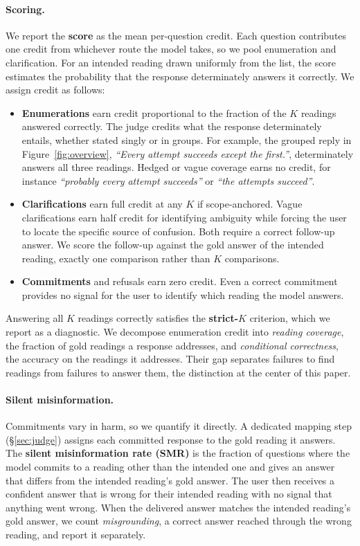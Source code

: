 \paragraph{Scoring.}
We report the \textbf{\bench{} score} as the mean per-question credit. Each question contributes one credit from whichever route the model takes, so we pool enumeration and clarification. For an intended reading drawn uniformly from the list, the score estimates the probability that the response determinately answers it correctly. We assign credit as follows:
\begin{itemize}
\item \textbf{Enumerations} earn credit proportional to the fraction of the $K$ readings answered correctly. The judge credits what the response determinately entails, whether stated singly or in groups. For example, the grouped reply in Figure~\ref{fig:overview}, \textit{``Every attempt succeeds except the first.''}, determinately answers all three readings. Hedged or vague coverage earns no credit, for instance \textit{``probably every attempt succeeds''} or \textit{``the attempts succeed''}.
\item \textbf{Clarifications} earn full credit at any $K$ if scope-anchored. Vague clarifications earn half credit for identifying ambiguity while forcing the user to locate the specific source of confusion. Both require a correct follow-up answer. We score the follow-up against the gold answer of the intended reading, exactly one comparison rather than $K$ comparisons.
\item \textbf{Commitments} and refusals earn zero credit. Even a correct commitment provides no signal for the user to identify which reading the model answers.
\end{itemize}
Answering all $K$ readings correctly satisfies the \textbf{strict-$K$} criterion, which we report as a diagnostic. We decompose enumeration credit into \textit{reading coverage}, the fraction of gold readings a response addresses, and \textit{conditional correctness}, the accuracy on the readings it addresses. Their gap separates failures to find readings from failures to answer them, the distinction at the center of this paper.

\paragraph{Silent misinformation.} Commitments vary in harm, so we quantify it directly. A dedicated mapping step (\S\ref{sec:judge}) assigns each committed response to the gold reading it answers. The \textbf{silent misinformation rate (SMR)} is the fraction of questions where the model commits to a reading other than the intended one and gives an answer that differs from the intended reading's gold answer. The user then receives a confident answer that is wrong for their intended reading with no signal that anything went wrong. When the delivered answer matches the intended reading's gold answer, we count \textit{misgrounding}, a correct answer reached through the wrong reading, and report it separately.


